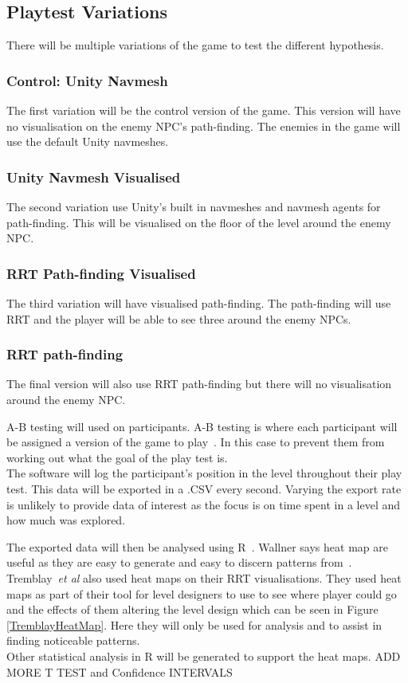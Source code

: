 \documentclass[journal]{IEEEtran}
\begin{document}
\subsection{Playtest Variations}
There will be multiple variations of the game to test the different hypothesis. 

\subsubsection{Control: Unity Navmesh}
The first variation will be the control version of the game. This version will have no visualisation on the enemy NPC's path-finding. The enemies in the game will use the default Unity navmeshes.

\subsubsection{Unity Navmesh Visualised}
The second variation use Unity's built in navmeshes and navmesh agents for path-finding. This will be visualised on the floor of the level around the enemy NPC.

\subsubsection{RRT Path-finding Visualised}
The third variation will have visualised path-finding. The path-finding will use RRT and the player will be able to see three around the enemy NPCs.

\subsubsection{RRT path-finding}
The final version will also use RRT path-finding but there will no visualisation around the enemy NPC.

A-B testing will used on participants. A-B testing is where each participant will be assigned a version of the game to play~\cite{Hynninen2014}. In this case to prevent them from working out what the goal of the play test is. 
\\
The software will log the participant's position in the level throughout their play test. This data will be exported in a .CSV every second. Varying the export rate is unlikely to provide data of interest as the focus is on time spent in a level and how much was explored. 

The exported data will then be analysed using R~\cite{software:R}. Wallner says heat map are useful as they are easy to generate and easy to discern patterns from~\cite{Wallner2015}.  Tremblay~\textit{et al} also used heat maps on their RRT visualisations. They used heat maps as part of their tool for level designers to use to see where player could go and the effects of them altering the level design which can be seen in Figure \ref{TremblayHeatMap}. Here they will only be used for analysis and to assist in finding noticeable patterns.
\\
Other statistical analysis in R will be generated to support the heat maps. ADD MORE T TEST and Confidence INTERVALS
 
\end{document}
